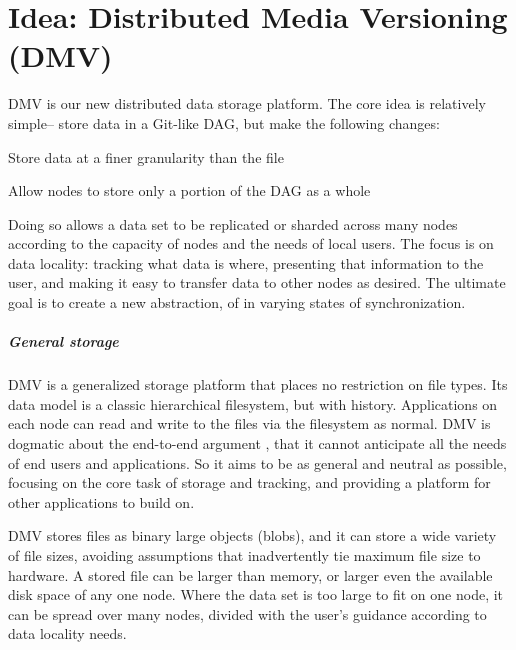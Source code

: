 \chapter{Idea: Distributed Media Versioning (DMV)}


\gls{DMV} is our new distributed data storage platform. The core idea is
relatively simple-- store data in a Git-like \gls{DAG}, but make the following
changes:

\begin{tight_enumerate}

    \item{Store data at a finer granularity than the file}

    \item{Allow nodes to store only a portion of the \gls{DAG} as a whole}

\end{tight_enumerate}

Doing so allows a data set to be replicated or sharded across many nodes
according to the capacity of nodes and the needs of local users. The focus is on
data locality: tracking what data is where, presenting that information to the
user, and making it easy to transfer data to other nodes as desired. The
ultimate goal is to create a new abstraction, of  in varying states of synchronization.


\paragraph{General storage}

\gls{DMV} is a generalized storage platform that places no restriction on file
types. Its data model is a classic hierarchical filesystem, but with history.
Applications on each node can read and write to the files via the filesystem as
normal. \gls{DMV} is dogmatic about the end-to-end argument
\cite{endtoendargument}, that it cannot anticipate all the needs of end users
and applications. So it aims to be as general and neutral as possible, focusing
on the core task of storage and tracking, and providing a platform for other
applications to build on.

\gls{DMV} stores files as binary large objects (\glspl{blob}), and it can store
a wide variety of file sizes, avoiding assumptions that inadvertently tie
maximum file size to hardware. A stored file can be larger than memory, or
larger even the available disk space of any one node. Where the data set is too
large to fit on one node, it can be spread over many nodes, divided with the
user's guidance according to data locality needs.


